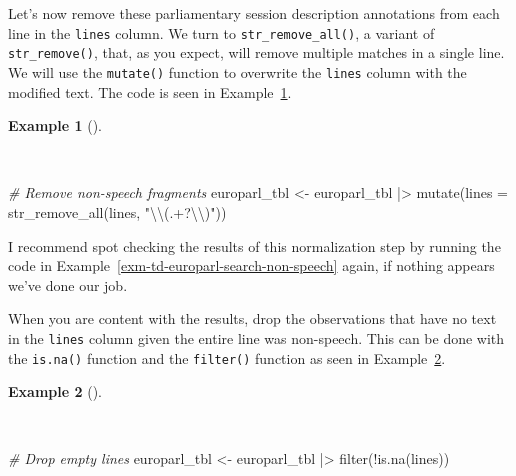 \documentclass[
  letterpaper,
]{latex/krantz}
\newenvironment{Shaded}{\begin{snugshade}}{\end{snugshade}}
\newcommand{\AttributeTok}[1]{\textcolor[rgb]{0.00,0.00,0.00}{#1}}
\newcommand{\CommentTok}[1]{\textcolor[rgb]{0.00,0.00,0.00}{\textit{#1}}}
\newcommand{\FunctionTok}[1]{\textcolor[rgb]{0.00,0.00,0.00}{#1}}
\newcommand{\NormalTok}[1]{\textcolor[rgb]{0.00,0.00,0.00}{#1}}
\newcommand{\OtherTok}[1]{\textcolor[rgb]{0.00,0.00,0.00}{#1}}
\newcommand{\SpecialCharTok}[1]{\textcolor[rgb]{0.00,0.00,0.00}{#1}}
\newcommand{\StringTok}[1]{\textcolor[rgb]{0.00,0.00,0.00}{#1}}
\theoremstyle{definition}
\newtheorem{example}{Example}[chapter]
\theoremstyle{remark}
\begin{document}
Let's now remove these parliamentary session description annotations
from each line in the \texttt{lines} column. We turn to
\texttt{str\_remove\_all()}, a variant of \texttt{str\_remove()}, that,
as you expect, will remove multiple matches in a single line. We will
use the \texttt{mutate()} function to overwrite the \texttt{lines}
column with the modified text. The code is seen in
Example~\ref{exm-td-europarl-remove-non-speech}.

\begin{example}[]\protect\hypertarget{exm-td-europarl-remove-non-speech}{}\label{exm-td-europarl-remove-non-speech}

~

\begin{Shaded}
\begin{Highlighting}[]
\CommentTok{\# Remove non{-}speech fragments}
\NormalTok{europarl\_tbl }\OtherTok{\textless{}{-}}
\NormalTok{  europarl\_tbl }\SpecialCharTok{|\textgreater{}}
  \FunctionTok{mutate}\NormalTok{(}\AttributeTok{lines =} \FunctionTok{str\_remove\_all}\NormalTok{(lines, }\StringTok{"}\SpecialCharTok{\textbackslash{}\textbackslash{}}\StringTok{(.+?}\SpecialCharTok{\textbackslash{}\textbackslash{}}\StringTok{)"}\NormalTok{))}
\end{Highlighting}
\end{Shaded}

\end{example}

I recommend spot checking the results of this normalization step by
running the code in Example~\ref{exm-td-europarl-search-non-speech}
again, if nothing appears we've done our job.

When you are content with the results, drop the observations that have
no text in the \texttt{lines} column given the entire line was
non-speech. This can be done with the \texttt{is.na()} function and the
\texttt{filter()} function as seen in
Example~\ref{exm-td-europarl-drop-empty-lines}.

\begin{example}[]\protect\hypertarget{exm-td-europarl-drop-empty-lines}{}\label{exm-td-europarl-drop-empty-lines}

~

\begin{Shaded}
\begin{Highlighting}[]
\CommentTok{\# Drop empty lines}
\NormalTok{europarl\_tbl }\OtherTok{\textless{}{-}}
\NormalTok{  europarl\_tbl }\SpecialCharTok{|\textgreater{}}
  \FunctionTok{filter}\NormalTok{(}\SpecialCharTok{!}\FunctionTok{is.na}\NormalTok{(lines))}
\end{Highlighting}
\end{Shaded}

\end{example}
\end{document}
